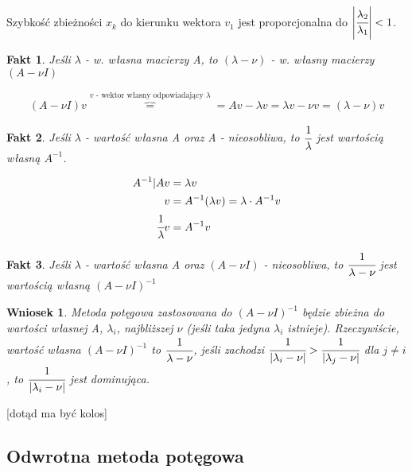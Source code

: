 \documentclass[hidelinks,a4paper,fleqn]{article}
\newcommand{\RR}{\mathbb{R}}
\newcommand{\CC}{\mathbb{C}}
\newtheorem{wniosek}{Wniosek}
\newtheorem{fakt}{Fakt}
\begin{document}
Szybkość zbieżności $x_k$ do kierunku wektora $v_1$ jest proporcjonalna do $\left| \cfrac{\lambda_2}{\lambda_1} \right| < 1$.
 
%


\begin{fakt}
	Jeśli $\lambda$ - w. własna macierzy A, to $(\lambda - \nu)$ - w. własny macierzy $(A - \nu I)$
	 
	\[
		(A - \nu I)v \overbrace{=}^{v\textrm{ - wektor własny odpowiadający }\lambda} = Av - \lambda v = \lambda v - \nu v = (\lambda - \nu)v
	\]
\end{fakt} 

\begin{fakt} Jeśli $\lambda$ - wartość własna A oraz A - nieosobliwa, to $\cfrac{1}{\lambda}$ jest wartością własną $A^{-1}$.
	
	\begin{equation}
		\begin{aligned}
			A^{-1}| Av           & = \lambda v                                  \\
			v                    & = A^{-1}(\lambda v) = \lambda \cdot A^{-1} v \\
			\cfrac{1}{\lambda} v & = A^{-1}v                                    
		\end{aligned}
	\end{equation}
	
\end{fakt}

\begin{fakt} Jeśli $\lambda$ - wartość własna A oraz $(A - \nu I)$ - nieosobliwa, to $\cfrac{1}{\lambda - \nu}$ jest wartością własną $(A - \nu I)^{-1}$
\end{fakt}

\begin{wniosek} Metoda potęgowa zastosowana do $(A - \nu I)^{-1}$ będzie zbieżna do wartości własnej A, $\lambda_i$, najbliższej $\nu$ (jeśli taka jedyna $\lambda_i$ istnieje). Rzeczywiście, wartość własna $(A - \nu I)^{-1}$ to $\cfrac{1}{\lambda - \nu}$, jeśli zachodzi $\cfrac{1}{|\lambda_i - \nu|} > \cfrac{1}{|\lambda_j - \nu|}$ dla $j \neq i$, to $\cfrac{1}{|\lambda_i - \nu|}$ jest dominująca.
\end{wniosek}

[dotąd ma być kolos]

\subsection{Odwrotna metoda potęgowa}
\end{document}
